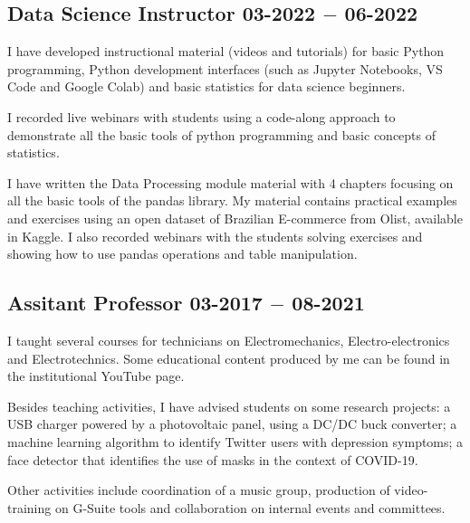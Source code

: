 \subsection{{Data Science Instructor \hfill 03-2022 $-$ 06-2022}}
\begin{zitemize}
\item I have developed instructional material (videos and tutorials) for basic Python programming, Python development interfaces (such as Jupyter Notebooks, VS Code and Google Colab) 
and basic statistics for data science beginners.
\item I recorded live webinars with students using a code-along approach to demonstrate all the basic tools of python programming and basic concepts of statistics.
\item I have written the Data Processing module material with 4 chapters focusing on all the basic tools of the pandas library. My material contains practical examples 
and exercises using an open dataset of Brazilian E-commerce from Olist, available in Kaggle. I also recorded webinars with the students solving exercises 
and showing how to use pandas operations and table manipulation.
\end{zitemize}

\subsection{{Assitant Professor \hfill 03-2017 $-$ 08-2021}}
\begin{zitemize}
\item I taught several courses for technicians on Electromechanics, Electro-electronics and Electrotechnics. Some educational content produced by me can be found in the institutional YouTube page. 
\item Besides teaching activities, I have advised students on some research projects: a USB charger powered by a photovoltaic panel, using a DC/DC buck converter; 
a machine learning algorithm to identify Twitter users with depression symptoms; a face detector that identifies the use of masks in the context of COVID-19.
\item Other activities include coordination of a music group, production of video-training on G-Suite tools and collaboration on internal events and committees.
\end{zitemize}

